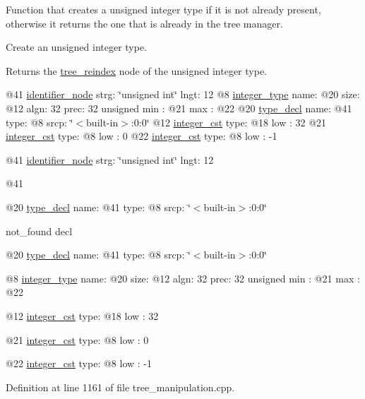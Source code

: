 Function that creates a unsigned integer type if it is not already present, otherwise it returns the one that is already in the tree manager. 

Create an unsigned integer type.

\begin{DoxyReturn}{Returns}
the \hyperlink{classtree__reindex}{tree\+\_\+reindex} node of the unsigned integer type. 
\end{DoxyReturn}
@41 \hyperlink{structidentifier__node}{identifier\+\_\+node} strg\+: \char`\"{}unsigned int\char`\"{} lngt\+: 12 @8 \hyperlink{structinteger__type}{integer\+\_\+type} name\+: @20 size\+: @12 algn\+: 32 prec\+: 32 unsigned min \+: @21 max \+: @22 @20 \hyperlink{structtype__decl}{type\+\_\+decl} name\+: @41 type\+: @8 srcp\+: \char`\"{}$<$built-\/in$>$\+:0\+:0\char`\"{} @12 \hyperlink{structinteger__cst}{integer\+\_\+cst} type\+: @18 low \+: 32 @21 \hyperlink{structinteger__cst}{integer\+\_\+cst} type\+: @8 low \+: 0 @22 \hyperlink{structinteger__cst}{integer\+\_\+cst} type\+: @8 low \+: -\/1

@41 \hyperlink{structidentifier__node}{identifier\+\_\+node} strg\+: \char`\"{}unsigned int\char`\"{} lngt\+: 12

@41

@20 \hyperlink{structtype__decl}{type\+\_\+decl} name\+: @41 type\+: @8 srcp\+: \char`\"{}$<$built-\/in$>$\+:0\+:0\char`\"{}

not\+\_\+found decl

@20 \hyperlink{structtype__decl}{type\+\_\+decl} name\+: @41 type\+: @8 srcp\+: \char`\"{}$<$built-\/in$>$\+:0\+:0\char`\"{}

@8 \hyperlink{structinteger__type}{integer\+\_\+type} name\+: @20 size\+: @12 algn\+: 32 prec\+: 32 unsigned min \+: @21 max \+: @22

@12 \hyperlink{structinteger__cst}{integer\+\_\+cst} type\+: @18 low \+: 32

@21 \hyperlink{structinteger__cst}{integer\+\_\+cst} type\+: @8 low \+: 0

@22 \hyperlink{structinteger__cst}{integer\+\_\+cst} type\+: @8 low \+: -\/1 

Definition at line 1161 of file tree\+\_\+manipulation.\+cpp.



